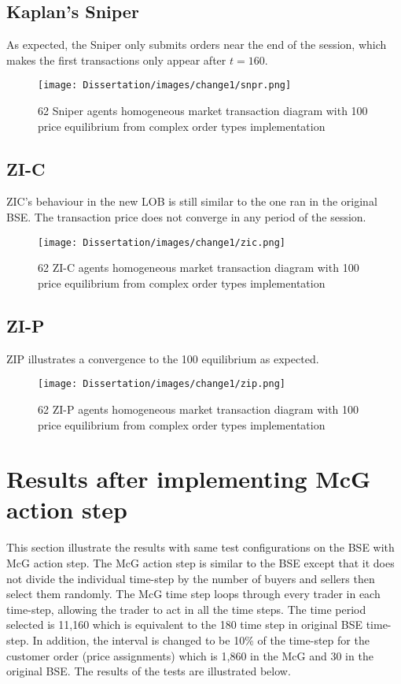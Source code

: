 \subsection{Kaplan's Sniper}
As expected, the Sniper only submits orders near the end of the session, which makes the first transactions only appear after $t = 160$.  
\begin{figure}[h]
\texttt{[image: Dissertation/images/change1/snpr.png]}
\caption{62 Sniper agents homogeneous market transaction diagram with 100 price equilibrium from complex order types implementation} 
\end{figure} 
\FloatBarrier

\subsection{ZI-C}
ZIC's behaviour in the new LOB is still similar to the one ran in the original BSE. The transaction price does not converge in any period of the session. 

\begin{figure}[h]
\texttt{[image: Dissertation/images/change1/zic.png]}
\caption{62 ZI-C agents homogeneous market transaction diagram with 100 price equilibrium from complex order types implementation} 
\end{figure} 
\FloatBarrier

\subsection{ZI-P}
ZIP illustrates a convergence to the 100 equilibrium as expected. 

\begin{figure}[h]
\texttt{[image: Dissertation/images/change1/zip.png]}
\caption{62 ZI-P agents homogeneous market transaction diagram with 100 price equilibrium from complex order types implementation} 
\end{figure} 
\FloatBarrier

\section{Results after implementing McG action step} 
This section illustrate the results with same test configurations on the BSE with McG action step. The McG action step is similar to the BSE except that it does not divide the individual time-step by the number of buyers and sellers then select them randomly. The McG time step loops through every trader in each time-step, allowing the trader to act in all the time steps. The time period selected is 11,160 which is equivalent to the 180 time step in original BSE time-step. In addition, the interval is changed to be 10\% of the time-step for the customer order (price assignments) which is 1,860 in the McG and 30 in the original BSE. The results of the tests are illustrated below. 

